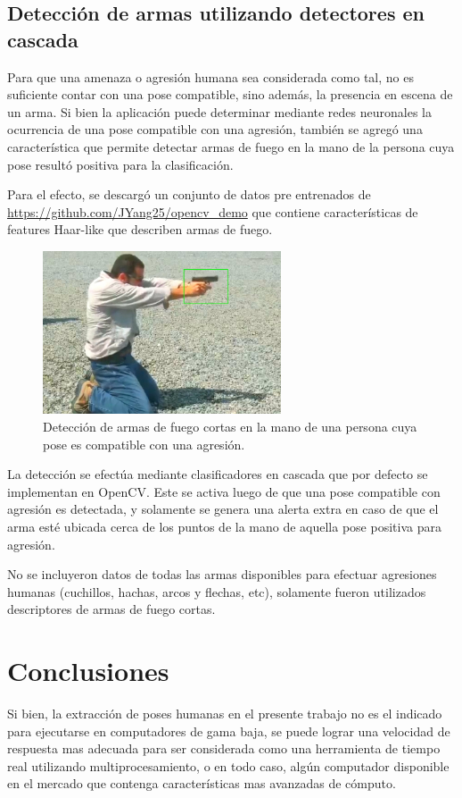 \documentclass[a4paper,12pt,oneside,spanish]{book}
\begin{document}
\section{Detección de armas utilizando detectores en cascada}
Para que una amenaza o agresión humana sea considerada como tal, no es suficiente contar con una pose compatible, sino además, la presencia en escena de un arma. Si bien la aplicación puede determinar mediante redes neuronales la ocurrencia de una pose compatible con una agresión, también se agregó una característica que permite detectar armas de fuego en la mano de la persona cuya pose resultó positiva para la clasificación.\par

Para el efecto, se descargó un conjunto de datos pre entrenados de \url{https://github.com/JYang25/opencv_demo} que contiene características de features Haar-like que describen armas de fuego.

\begin{figure}[h!]
	\includegraphics[width=200pt]{Imagenes/output2.jpg}
	\centering	
	\caption{Detección de armas de fuego cortas en la mano de una persona cuya pose es compatible con una agresión.}
	\label{fig:output2}
\end{figure}

La detección se efectúa mediante clasificadores en cascada que por defecto se implementan en OpenCV. Este se activa luego de que una pose compatible con agresión es detectada, y solamente se genera una alerta extra en caso de que el arma esté ubicada cerca de los puntos de la mano de aquella pose positiva para agresión.\par

No se incluyeron datos de todas las armas disponibles para efectuar agresiones humanas (cuchillos, hachas, arcos y flechas, etc), solamente fueron utilizados descriptores de armas de fuego cortas.\par

\newpage
\chapter{Conclusiones}
Si bien, la extracción de poses humanas en el presente trabajo no es el indicado para ejecutarse en computadores de gama baja, se puede lograr una velocidad de respuesta mas adecuada para ser considerada como una herramienta de tiempo real utilizando multiprocesamiento, o en todo caso, algún computador disponible en el mercado que contenga características mas avanzadas de cómputo.\par
\end{document}
